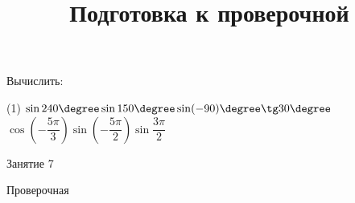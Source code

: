 	\begin{homework}[number=3]
		\begin{listofex}
			\item Вычислить:
			\begin{tasks}(1)
				\task \( \sin240\degree\sin150\degree\sin(-90)\degree\tg30\degree \)
				\task \( \cos\left( -\dfrac{5\pi}{3} \right)\sin\left( -\dfrac{5\pi}{2} \right)\sin\dfrac{3\pi}{2} \)
			\end{tasks}
		\end{listofex}
	\end{homework}
	
	\begin{class}[number=7]
		\title{Подготовка к проверочной}
		\begin{listofex}
			\item Занятие 7
		\end{listofex}
	\end{class}
	
	\begin{exam}
		\begin{listofex}
			\item Проверочная
		\end{listofex}
	\end{exam}
